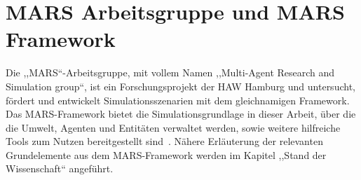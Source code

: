 %
%
\section{MARS Arbeitsgruppe und MARS Framework}\label{sec:mars-arbeitsgruppe-und-mars-framework}

Die ,,MARS``-Arbeitsgruppe, mit vollem Namen ,,Multi-Agent Research and Simulation group``, ist ein Forschungsprojekt der HAW Hamburg und untersucht, fördert und entwickelt Simulationsszenarien mit dem gleichnamigen Framework.
Das MARS-Framework bietet die Simulationsgrundlage in dieser Arbeit, über die die Umwelt, Agenten und Entitäten verwaltet werden, sowie weitere hilfreiche Tools zum Nutzen bereitgestellt sind~\cite{Mulack2020}.
Nähere Erläuterung der relevanten Grundelemente aus dem MARS-Framework werden im Kapitel ,,Stand der Wissenschaft`` angeführt.
